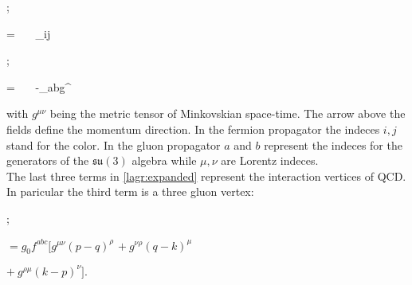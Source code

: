 \begin{minipage}{0.4\textwidth}
\begin{center}
    ;     
\end{center}
\end{minipage}
\begin{minipage}{0.58\textwidth}
        \beq \nonumber = ~~~\delta_{ij} ~~~~~~~~~~~~~~~~~~~~~~~~~~~~~\eeq
\end{minipage} 

\begin{minipage}{0.4\textwidth}
\begin{center}
    ; 
\end{center}
\end{minipage}
\begin{minipage}{0.58\textwidth}
        \beq \nonumber = ~~~-\delta_{ab}g^{\mu\nu} ~~~~~~~~~~~~~~~~~~~~~~~~~~~~\eeq
\end{minipage}

with $g^{\mu\nu}$ being the metric tensor of Minkovskian space-time. The arrow above the fields define the momentum direction. In the fermion propagator the indeces $i,j$ stand for the color. In the gluon propagator $a$ and $b$ represent the indeces for the generators of the $\mathfrak{su}(3)$ algebra while $\mu,\nu$ are Lorentz indeces. \\
The last three terms in \cref{lagr:expanded} represent the interaction vertices of QCD. In paricular the third term is a three gluon vertex:
\begin{center}
\begin{minipage}{0.4\textwidth}
    \hspace{2cm};
\end{minipage}
\begin{minipage}{0.58\textwidth}
    \hspace{1cm} $ = g_0 f^{abc}[g^{\mu\nu}(p-q)^\rho $ \newline
    \vspace{-0.15cm}
    \hspace{2.0cm} $+~g^{\nu\rho}(q-k)^\mu $ \newline
    
    \vspace{-0.2cm}
    \hspace{2.1cm} $+~g^{\rho\mu}(k-p)^\nu ] .$
\end{minipage}
\end{center}

